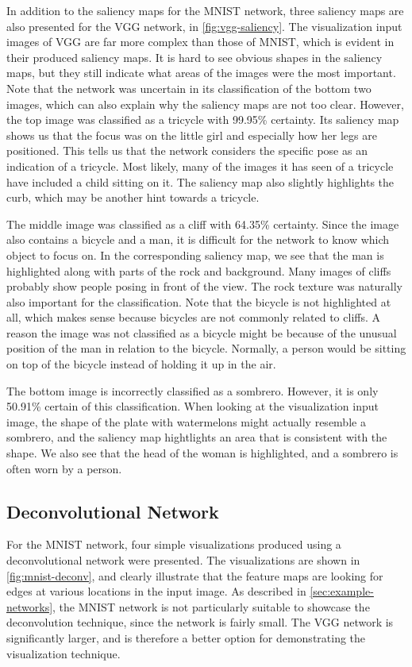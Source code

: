 \noindent In addition to the saliency maps for the MNIST network, three saliency maps are also presented for the VGG network, in \autoref{fig:vgg-saliency}. The visualization input images of VGG are far more complex than those of MNIST, which is evident in their produced saliency maps. It is hard to see obvious shapes in the saliency maps, but they still indicate what areas of the images were the most important. Note that the network was uncertain in its classification of the bottom two images, which can also explain why the saliency maps are not too clear. However, the top image was classified as a tricycle with 99.95\% certainty. Its saliency map shows us that the focus was on the little girl and especially how her legs are positioned. This tells us that the network considers the specific pose as an indication of a tricycle. Most likely, many of the images it has seen of a tricycle have included a child sitting on it. The saliency map also slightly highlights the curb, which may be another hint towards a tricycle. 

The middle image was classified as a cliff with 64.35\% certainty. Since the image also contains a bicycle and a man, it is difficult for the network to know which object to focus on. In the corresponding saliency map, we see that the man is highlighted along with parts of the rock and background. Many images of cliffs probably show people posing in front of the view. The rock texture was naturally also important for the classification. Note that the bicycle is not highlighted at all, which makes sense because bicycles are not commonly related to cliffs. A reason the image was not classified as a bicycle might be because of the unusual position of the man in relation to the bicycle. Normally, a person would be sitting on top of the bicycle instead of holding it up in the air.

The bottom image is incorrectly classified as a sombrero. However, it is only 50.91\% certain of this classification. When looking at the visualization input image, the shape of the plate with watermelons might actually resemble a sombrero, and the saliency map hightlights an area that is consistent with the shape. We also see that the head of the woman is highlighted, and a sombrero is often worn by a person.

\subsection{Deconvolutional Network}

For the MNIST network, four simple visualizations produced using a deconvolutional network were presented. The visualizations are shown in \autoref{fig:mnist-deconv}, and clearly illustrate that the feature maps are looking for edges at various locations in the input image. As described in \autoref{sec:example-networks}, the MNIST network is not particularly suitable to showcase the deconvolution technique, since the network is fairly small. The VGG network is significantly larger, and is therefore a better option for demonstrating the visualization technique. \\

